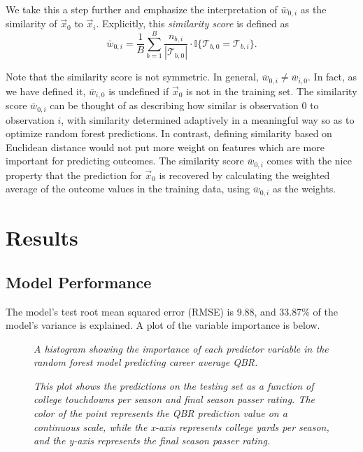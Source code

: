 \documentclass{article}
\begin{document}
We take this a step further and emphasize the interpretation of $\bar w_{0,i}$ as the similarity of $\vec x_0$ to $\vec x_i$. Explicitly, this {\it similarity score} is defined as
\begin{equation}
  \bar w_{0,i} = \frac{1}{B}\sum_{b = 1}^B
    \frac{n_{b,i}}{|\mathcal{T}_{b,0}|} \cdot \mathbb{I}\{\mathcal{T}_{b,0} = \mathcal{T}_{b,i}\}.
\end{equation}

Note that the similarity score is not symmetric. In general, $\bar w_{0,i} \ne \bar w_{i,0}$. In fact, as we have defined it, $\bar w_{i,0}$ is undefined if $\vec x_0$ is not in the training set. The similarity score $\bar w_{0,i}$ can be thought of as describing how similar is observation 0 to observation $i$, with similarity determined adaptively in a meaningful way so as to optimize random forest predictions. In contrast, defining similarity based on Euclidean distance would not put more weight on features which are more important for predicting outcomes. The similarity score $\bar w_{0,i}$ comes with the nice property that the prediction for $\vec x_0$ is recovered by calculating the weighted average of the outcome values in the training data, using $\bar w_{0,i}$ as the weights.

\section{Results}
\label{sec:results}

\subsection{Model Performance}

The model's test root mean squared error (RMSE) is 9.88, and 33.87\% of the model's variance is explained. A plot of the variable importance is below. 

\begin{figure}[H]
    \centering
    \caption{\textit{A histogram showing the importance of each predictor variable in the random forest model predicting career average QBR.}}
    \label{fig:importance}
\end{figure}

\begin{figure}[H]
    \centering
    \caption{\textit{This plot shows the predictions on the testing set as a function of college touchdowns per season and final season passer rating. The color of the point represents the QBR prediction value on a continuous scale, while the x-axis represents college yards per season, and the y-axis represents the final season passer rating.}}
\end{figure}
\end{document}
